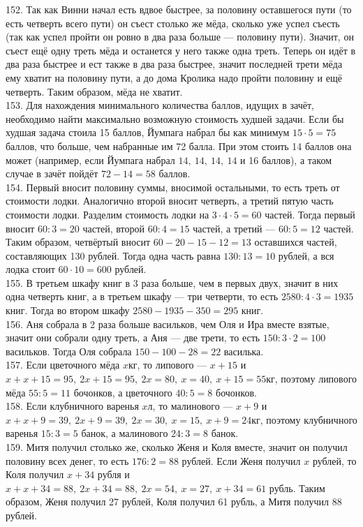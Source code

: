 \documentclass[12pt]{article}
\begin{document}
152. Так как Винни начал есть вдвое быстрее, за половину оставшегося пути (то есть четверть всего пути) он съест столько же мёда, сколько уже успел съесть (так как успел пройти он ровно в два раза больше --- половину пути). Значит, он съест ещё одну треть мёда и останется у него также одна треть. Теперь он идёт в два раза быстрее и ест также в два раза быстрее, значит последней трети мёда ему хватит на половину пути, а до дома Кролика надо пройти половину и ещё четверть. Таким образом, мёда не хватит.\\
153. Для нахождения минимального количества баллов, идущих в зачёт, необходимо найти максимально возможную стоимость худшей задачи. Если бы худшая задача стоила 15 баллов, Йумпага набрал бы как минимум $15\cdot5=75$ баллов, что больше, чем набранные им 72 балла. При этом стоить 14 баллов она может (например, если Йумпага набрал $14,\ 14,\ 14,\ 14$ и 16 баллов), а таком случае в зачёт пойдёт $72-14=58$ баллов.\\
154. Первый вносит половину суммы, вносимой остальными, то есть треть от стоимости лодки. Аналогично второй вносит четверть, а третий пятую часть стоимости лодки.
Разделим стоимость лодки на $3\cdot4\cdot5=60$ частей. Тогда первый вносит $60:3=20$ частей, второй $60:4=15$ частей, а третий --- $60:5=12$ частей. Таким образом, четвёртый вносит $60-20-15-12=13$ оставшихся частей, составляющих 130 рублей. Тогда одна часть равна $130:13=10$ рублей, а вся лодка стоит $60\cdot10=600$ рублей.\\
155. В третьем шкафу книг в 3 раза больше, чем в первых двух, значит в них одна четверть книг, а в третьем шкафу --- три четверти, то есть $2580:4\cdot3=1935$ книг. Тогда во втором шкафу $2580-1935-350=295$ книг.\\
156. Аня собрала в 2 раза больше васильков, чем Оля и Ира вместе взятые, значит они собрали одну треть, а Аня --- две трети, то есть $150:3\cdot2=100$ васильков. Тогда Оля собрала $150-100-28=22$ василька.\\
157. Если цветочного мёда $x$кг, то липового --- $x+15$ и $x+x+15=95,\ 2x+15=95,\ 2x=80,\ x=40,\ x+15=55$кг, поэтому липового мёда $55:5=11$ бочонков, а цветочного $40:5=8$ бочонков.\\
158. Если клубничного варенья $x$л, то малинового --- $x+9$ и $x+x+9=39,\ 2x+9=39,\ 2x=30,\ x=15,\ x+9=24$кг, поэтому клубничного варенья $15:3=5$ банок, а малинового $24:3=8$ банок.\\
159. Митя получил столько же, сколько Женя и Коля вместе, значит он получил половину всех денег, то есть $176:2=88$ рублей. Если Женя получил $x$ рублей, то Коля получил $x+34$ рубля и  $x+x+34=88,\ 2x+34=88,\ 2x=54,\ x=27,\ x+34=61$ рубль. Таким образом, Женя получил 27 рублей, Коля получил 61 рубль, а Митя получил 88 рублей.\\
\end{document}
